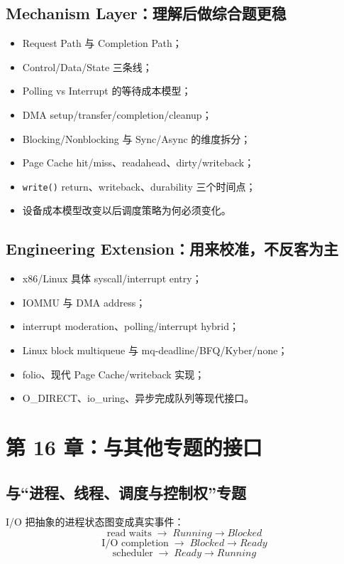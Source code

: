 \documentclass[11pt,a4paper]{ctexart}
\newcommand{\code}[1]{\texttt{#1}}
\newcommand{\arr}{\;\longrightarrow\;}
\begin{document}
\subsection{Mechanism Layer：理解后做综合题更稳}
\begin{itemize}
  \item Request Path 与 Completion Path；
  \item Control/Data/State 三条线；
  \item Polling vs Interrupt 的等待成本模型；
  \item DMA setup/transfer/completion/cleanup；
  \item Blocking/Nonblocking 与 Sync/Async 的维度拆分；
  \item Page Cache hit/miss、readahead、dirty/writeback；
  \item \code{write()} return、writeback、durability 三个时间点；
  \item 设备成本模型改变以后调度策略为何必须变化。
\end{itemize}

\subsection{Engineering Extension：用来校准，不反客为主}
\begin{itemize}
  \item x86/Linux 具体 syscall/interrupt entry；
  \item IOMMU 与 DMA address；
  \item interrupt moderation、polling/interrupt hybrid；
  \item Linux block multiqueue 与 mq-deadline/BFQ/Kyber/none；
  \item folio、现代 Page Cache/writeback 实现；
  \item O\_DIRECT、io\_uring、异步完成队列等现代接口。
\end{itemize}

\section{第 16 章：与其他专题的接口}

\subsection{与“进程、线程、调度与控制权”专题}
I/O 把抽象的进程状态图变成真实事件：
\[
\boxed{\text{read waits}\arr Running\to Blocked}
\]
\[
\boxed{\text{I/O completion}\arr Blocked\to Ready}
\]
\[
\boxed{\text{scheduler}\arr Ready\to Running}
\]
\end{document}
